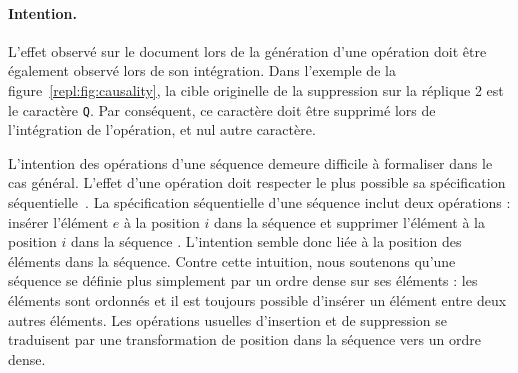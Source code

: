 
\paragraph{Intention.} L'effet observé sur le document lors de la génération
d'une opération doit être également observé lors de son intégration.  Dans
l'exemple de la figure~\ref{repl:fig:causality}, la cible originelle de la
suppression sur la réplique 2 est le caractère \texttt{Q}. Par conséquent, ce
caractère doit être supprimé lors de l'intégration de l'opération, et nul autre
caractère.


\noindent L'intention des opérations d'une séquence demeure difficile à
formaliser dans le cas général. L'effet d'une opération doit respecter le plus
possible sa spécification séquentielle~\cite{bieniusa2012brief}. La
spécification séquentielle d'une séquence inclut deux opérations : \og insérer
l'élément $e$ à la position $i$ dans la séquence \fg et \og supprimer l'élément
à la position $i$ dans la séquence \fg. L'intention semble donc liée à la
position des éléments dans la séquence. Contre cette intuition, nous soutenons
qu'une séquence se définie plus simplement par un ordre dense sur ses éléments :
les éléments sont ordonnés et il est toujours possible d'insérer un élément
entre deux autres éléments. Les opérations usuelles d'insertion et de
suppression se traduisent par une transformation de position dans la séquence
vers un ordre dense.

